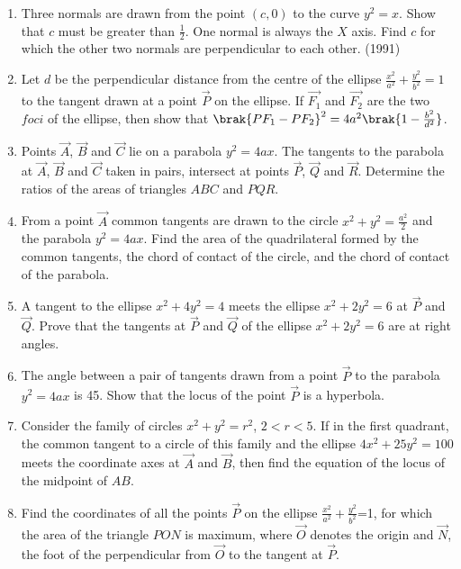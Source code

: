 \begin{enumerate}[label=\thesubsection.\arabic*.,ref=\thesubsection.\theenumi]
	\item Three normals are drawn from the point $(c,0)$ to the curve $y^2=x$. Show that $c$ must be greater than $\frac{1}{2}$. One normal is always the $X$ axis. Find $c$ for which the other two normals are perpendicular to each other. 
	      \hfill(1991)
\item Let $d$ be the perpendicular distance from the centre of the ellipse $\frac{x^2}{a^2}+\frac{y^2}{b^2}=1$ to the tangent drawn at a point $\vec{P}$ on the ellipse. If $\vec{F_1}$ and $\vec{F_2}$ are the two $foci$ of the ellipse, then show that $\brak{PF_1-PF_2}^2=4a^2\brak{1-\frac{b^2}{d^2}}$. \hfill{}

\item Points $\vec{A}$, $\vec{B}$ and $\vec{C}$ lie on a parabola $y^2=4ax$. The tangents to the parabola at $\vec{A}$, $\vec{B}$ and $\vec{C}$ taken in pairs, intersect at points $\vec{P}$, $\vec{Q}$ and $\vec{R}$. Determine the ratios of the areas of triangles $ABC$ and $PQR$. \hfill{}

\item From a point $\vec{A}$ common tangents are drawn to the circle $x^2+y^2=\frac{a^2}{2}$ and the parabola $y^2=4ax$. Find the area of the quadrilateral formed by the common tangents, the chord of contact of the circle, and the chord of contact of the parabola. \hfill{}

\item A tangent to the ellipse $x^2+4y^2=4$ meets the ellipse $x^2+2y^2=6$ at $\vec{P}$ and $\vec{Q}$. Prove that the tangents at $\vec{P}$ and $\vec{Q}$ of the ellipse $x^2+2y^2=6$ are at right angles. \hfill{}

\item The angle between a pair of tangents drawn from a point $\vec{P}$ to the parabola $y^2=4ax$ is 45\degree. Show that the locus of the point $\vec{P}$ is a hyperbola. \hfill{}

\item Consider the family of circles $x^2+y^2=r^2$, $2<r<5$. If in the first quadrant, the common tangent to a circle of this family and the ellipse $4x^2+25y^2=100$ meets the coordinate axes at $\vec{A}$ and $\vec{B}$, then find the equation of the locus of the midpoint of $AB$. \hfill{}

\item Find the coordinates of all the points $\vec{P}$ on the ellipse $\frac{x^2}{a^2}+\frac{y^2}{b^2}$=1, for which the area of the triangle $PON$ is maximum, where $\vec{O}$ denotes the origin and $\vec{N}$, the foot of the perpendicular from $\vec{O}$ to the tangent at $\vec{P}$. \hfill{}


\end{enumerate}
